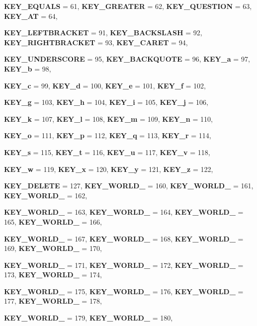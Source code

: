 \begin{DoxyCompactItemize}
{\bfseries KEY\_\-EQUALS} =  61, 
{\bfseries KEY\_\-GREATER} =  62, 
{\bfseries KEY\_\-QUESTION} =  63, 
{\bfseries KEY\_\-AT} =  64, 
\par
{\bfseries KEY\_\-LEFTBRACKET} =  91, 
{\bfseries KEY\_\-BACKSLASH} =  92, 
{\bfseries KEY\_\-RIGHTBRACKET} =  93, 
{\bfseries KEY\_\-CARET} =  94, 
\par
{\bfseries KEY\_\-UNDERSCORE} =  95, 
{\bfseries KEY\_\-BACKQUOTE} =  96, 
{\bfseries KEY\_\-a} =  97, 
{\bfseries KEY\_\-b} =  98, 
\par
{\bfseries KEY\_\-c} =  99, 
{\bfseries KEY\_\-d} =  100, 
{\bfseries KEY\_\-e} =  101, 
{\bfseries KEY\_\-f} =  102, 
\par
{\bfseries KEY\_\-g} =  103, 
{\bfseries KEY\_\-h} =  104, 
{\bfseries KEY\_\-i} =  105, 
{\bfseries KEY\_\-j} =  106, 
\par
{\bfseries KEY\_\-k} =  107, 
{\bfseries KEY\_\-l} =  108, 
{\bfseries KEY\_\-m} =  109, 
{\bfseries KEY\_\-n} =  110, 
\par
{\bfseries KEY\_\-o} =  111, 
{\bfseries KEY\_\-p} =  112, 
{\bfseries KEY\_\-q} =  113, 
{\bfseries KEY\_\-r} =  114, 
\par
{\bfseries KEY\_\-s} =  115, 
{\bfseries KEY\_\-t} =  116, 
{\bfseries KEY\_\-u} =  117, 
{\bfseries KEY\_\-v} =  118, 
\par
{\bfseries KEY\_\-w} =  119, 
{\bfseries KEY\_\-x} =  120, 
{\bfseries KEY\_\-y} =  121, 
{\bfseries KEY\_\-z} =  122, 
\par
{\bfseries KEY\_\-DELETE} =  127, 
{\bfseries KEY\_\-WORLD\_} =  160, 
{\bfseries KEY\_\-WORLD\_} =  161, 
{\bfseries KEY\_\-WORLD\_} =  162, 
\par
{\bfseries KEY\_\-WORLD\_} =  163, 
{\bfseries KEY\_\-WORLD\_} =  164, 
{\bfseries KEY\_\-WORLD\_} =  165, 
{\bfseries KEY\_\-WORLD\_} =  166, 
\par
{\bfseries KEY\_\-WORLD\_} =  167, 
{\bfseries KEY\_\-WORLD\_} =  168, 
{\bfseries KEY\_\-WORLD\_} =  169, 
{\bfseries KEY\_\-WORLD\_} =  170, 
\par
{\bfseries KEY\_\-WORLD\_} =  171, 
{\bfseries KEY\_\-WORLD\_} =  172, 
{\bfseries KEY\_\-WORLD\_} =  173, 
{\bfseries KEY\_\-WORLD\_} =  174, 
\par
{\bfseries KEY\_\-WORLD\_} =  175, 
{\bfseries KEY\_\-WORLD\_} =  176, 
{\bfseries KEY\_\-WORLD\_} =  177, 
{\bfseries KEY\_\-WORLD\_} =  178, 
\par
{\bfseries KEY\_\-WORLD\_} =  179, 
{\bfseries KEY\_\-WORLD\_} =  180, 

\end{DoxyCompactItemize}
